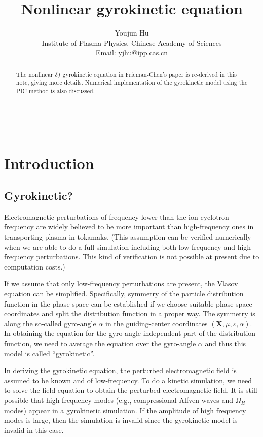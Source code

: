 \documentclass{article}
\newcommand{\tmaffiliation}[1]{\\ #1}
\begin{document}
\

\title{Nonlinear gyrokinetic equation}

\author{
  Youjun Hu
  \tmaffiliation{Institute of Plasma Physics, Chinese Academy of Sciences\\
  Email: yjhu@ipp.cas.cn}
}

\maketitle

\begin{abstract}
  The nonlinear $\delta f$ gyrokinetic equation in Frieman-Chen's
  paper{\cite{frieman1982}} is re-derived in this note, giving more details.
  Numerical implementation of the gyrokinetic model using the PIC method is
  also discussed.
\end{abstract}

\section{Introduction}

\subsection{Gyrokinetic?}

Electromagnetic perturbations of frequency lower than the ion cyclotron
frequency are widely believed to be more important than high-frequency ones in
transporting plasma in tokamaks. (This assumption can be verified numerically
when we are able to do a full simulation including both low-frequency and
high-frequency perturbations. This kind of verification is not possible at
present due to computation costs.)

If we assume that only low-frequency perturbations are present, the Vlasov
equation can be simplified. Specifically, symmetry of the particle
distribution function in the phase space can be established if we choose
suitable phase-space coordinates and split the distribution function in a
proper way. The symmetry is along the so-called gyro-angle $\alpha$ in the
guiding-center coordinates $(\mathbf{X}, \mu, \varepsilon, \alpha)$. In
obtaining the equation for the gyro-angle independent part of the distribution
function, we need to average the equation over the gyro-angle $\alpha$ and
thus this model is called ``gyrokinetic''.

In deriving the gyrokinetic equation, the perturbed electromagnetic field is
assumed to be known and of low-frequency. To do a kinetic simulation, we need
to solve the field equation to obtain the perturbed electromagnetic field. It
is still possible that high frequency modes (e.g., compressional Alfven waves
and $\Omega_H$ modes) appear in a gyrokinetic simulation. If the amplitude of
high frequency modes is large, then the simulation is invalid since the
gyrokinetic model is invalid in this case.
\end{document}
